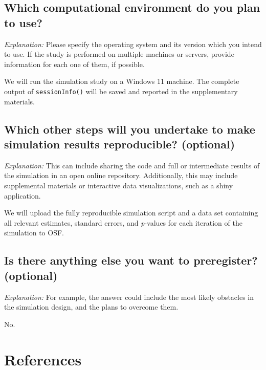 \documentclass[12pt]{article}
\begin{document}
\subsection{Which computational environment do you plan to use?}

\textit{Explanation:} Please specify the operating system and its version which you intend to use. If the study is performed on multiple machines or servers, provide information for each one of them, if possible.

\begin{examplebox}
We will run the simulation study on a Windows 11 machine. The complete output of \texttt{sessionInfo()} will be saved and reported in the supplementary materials.
\end{examplebox}

\subsection{Which other steps will you undertake to make simulation results reproducible? \textmd{(optional)}}

\textit{Explanation:} This can include sharing the code and full or intermediate results of the simulation in an open online repository. Additionally, this may include supplemental materials or interactive data visualizations, such as a shiny application.

\begin{examplebox}
We will upload the fully reproducible simulation script and a data set containing all relevant estimates, standard errors, and \textit{p}-values for each iteration of the simulation to OSF.
\end{examplebox}

\subsection{Is there anything else you want to preregister? \textmd{(optional)}}

\textit{Explanation:} For example, the answer could include the most likely obstacles in the simulation design, and the plans to overcome them.

\begin{examplebox}
No.
\end{examplebox}

\newpage
\section*{References}
\printbibliography[heading=none]
\end{document}
